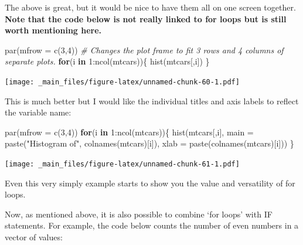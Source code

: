 \documentclass[
]{book}
\newenvironment{Shaded}{\begin{snugshade}}{\end{snugshade}}
\newcommand{\AttributeTok}[1]{\textcolor[rgb]{0.77,0.63,0.00}{#1}}
\newcommand{\CommentTok}[1]{\textcolor[rgb]{0.56,0.35,0.01}{\textit{#1}}}
\newcommand{\ControlFlowTok}[1]{\textcolor[rgb]{0.13,0.29,0.53}{\textbf{#1}}}
\newcommand{\DecValTok}[1]{\textcolor[rgb]{0.00,0.00,0.81}{#1}}
\newcommand{\FunctionTok}[1]{\textcolor[rgb]{0.00,0.00,0.00}{#1}}
\newcommand{\NormalTok}[1]{#1}
\newcommand{\SpecialCharTok}[1]{\textcolor[rgb]{0.00,0.00,0.00}{#1}}
\newcommand{\StringTok}[1]{\textcolor[rgb]{0.31,0.60,0.02}{#1}}
\theoremstyle{definition}
\theoremstyle{definition}
\theoremstyle{definition}
\theoremstyle{definition}
\theoremstyle{remark}
\begin{document}
The above is great, but it would be nice to have them all on one screen together. \textbf{Note that the code below is not really linked to for loops but is still worth mentioning here.}

\begin{Shaded}
\begin{Highlighting}[]
\FunctionTok{par}\NormalTok{(}\AttributeTok{mfrow =} \FunctionTok{c}\NormalTok{(}\DecValTok{3}\NormalTok{,}\DecValTok{4}\NormalTok{)) }\CommentTok{\# Changes the plot frame to fit 3 rows and 4 columns of separate plots.}
\ControlFlowTok{for}\NormalTok{(i }\ControlFlowTok{in} \DecValTok{1}\SpecialCharTok{:}\FunctionTok{ncol}\NormalTok{(mtcars))\{}
  \FunctionTok{hist}\NormalTok{(mtcars[,i])}
\NormalTok{\}}
\end{Highlighting}
\end{Shaded}

\texttt{[image: \_main\_files/figure-latex/unnamed-chunk-60-1.pdf]}

This is much better but I would like the individual titles and axis labels to reflect the variable name:

\begin{Shaded}
\begin{Highlighting}[]
\FunctionTok{par}\NormalTok{(}\AttributeTok{mfrow =} \FunctionTok{c}\NormalTok{(}\DecValTok{3}\NormalTok{,}\DecValTok{4}\NormalTok{))}
\ControlFlowTok{for}\NormalTok{(i }\ControlFlowTok{in} \DecValTok{1}\SpecialCharTok{:}\FunctionTok{ncol}\NormalTok{(mtcars))\{}
  \FunctionTok{hist}\NormalTok{(mtcars[,i], }\AttributeTok{main =} \FunctionTok{paste}\NormalTok{(}\StringTok{"Histogram of"}\NormalTok{, }\FunctionTok{colnames}\NormalTok{(mtcars)[i]), }\AttributeTok{xlab =} \FunctionTok{paste}\NormalTok{(}\FunctionTok{colnames}\NormalTok{(mtcars)[i]))}
\NormalTok{\}}
\end{Highlighting}
\end{Shaded}

\texttt{[image: \_main\_files/figure-latex/unnamed-chunk-61-1.pdf]}

Even this very simply example starts to show you the value and versatility of for loops.

Now, as mentioned above, it is also possible to combine `for loops' with IF statements. For example, the code below counts the number of even numbers in a vector of values:
\end{document}
